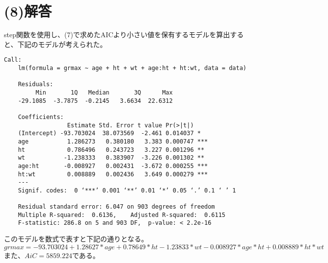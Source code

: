\documentclass[fontsize = 8pt, paper= a4]{jlreq}
\begin{document}
\section{(8)解答}

step関数を使用し、(7)で求めたAICより小さい値を保有するモデルを算出すると、下記のモデルが考えられた。
\begin{lstlisting}[basicstyle=\ttfamily\footnotesize, frame=single]
    Call:
    lm(formula = grmax ~ age + ht + wt + age:ht + ht:wt, data = data)
    
    Residuals:
         Min       1Q   Median       3Q      Max 
    -29.1085  -3.7875  -0.2145   3.6634  22.6312 
    
    Coefficients:
                  Estimate Std. Error t value Pr(>|t|)    
    (Intercept) -93.703024  38.073569  -2.461 0.014037 *  
    age           1.286273   0.380180   3.383 0.000747 ***
    ht            0.786496   0.243723   3.227 0.001296 ** 
    wt           -1.238333   0.383907  -3.226 0.001302 ** 
    age:ht       -0.008927   0.002431  -3.672 0.000255 ***
    ht:wt         0.008889   0.002436   3.649 0.000279 ***
    ---
    Signif. codes:  0 ‘***’ 0.001 ‘**’ 0.01 ‘*’ 0.05 ‘.’ 0.1 ‘ ’ 1
    
    Residual standard error: 6.047 on 903 degrees of freedom
    Multiple R-squared:  0.6136,    Adjusted R-squared:  0.6115 
    F-statistic: 286.8 on 5 and 903 DF,  p-value: < 2.2e-16
\end{lstlisting}
このモデルを数式で表すと下記の通りとなる。
$grmax = -93.703024 + 1.28627*age + 0.78649*ht - 1.23833*wt - 0.008927*age*ht + 0.008889*ht*wt$
また、$AiC = 5859.224$である。
\end{document}
